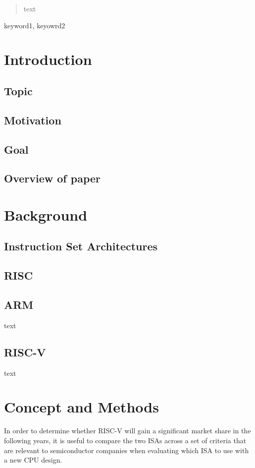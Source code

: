 \documentclass[conference]{IEEEtran}
\begin{document}
\begin{abstract}
text
\end{abstract}

\begin{IEEEkeywords}
keyword1, keyowrd2
\end{IEEEkeywords}

\section{Introduction}
\label{ref:introduction}
	\subsection{Topic}
	\subsection{Motivation}
	\subsection{Goal}
	\subsection{Overview of paper}

\section{Background}
\label{ref:background}
	\subsection{Instruction Set Architectures}
	\subsection{RISC}
	\subsection{ARM}
	text
	\subsection{RISC-V}
	text

\section{Concept and Methods}
\label{ref:concept}
In order to determine whether RISC-V will gain a significant market share in the following years, it is useful to compare the two \glspl{ISA}
across a set of criteria that are relevant to semiconductor companies when evaluating which \gls{ISA} to use with a new CPU design.
\end{document}
